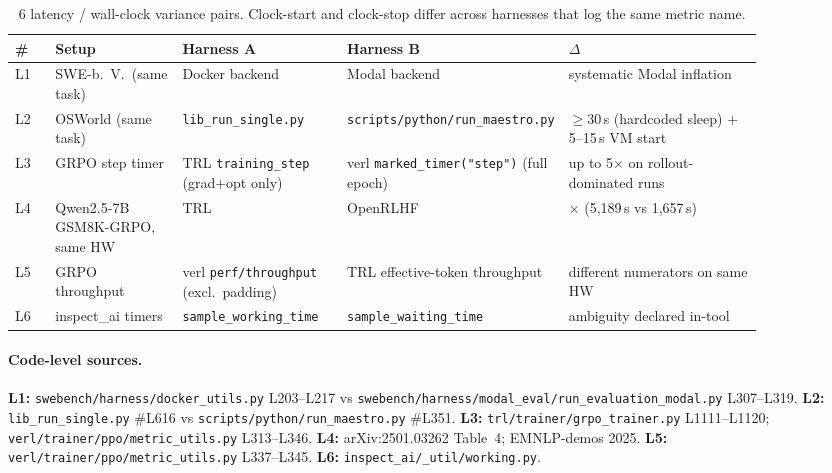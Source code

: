 \documentclass{article}
\begin{document}
\begin{table}[h]
\centering
\footnotesize
\setlength{\tabcolsep}{3pt}
\caption{6 latency / wall-clock variance pairs. Clock-start
and clock-stop differ across harnesses that log the same
metric name.}
\label{tab:vc:latency}
\begin{tabular}{@{}l>{\raggedright\arraybackslash}p{0.17\linewidth}>{\raggedright\arraybackslash}p{0.22\linewidth}>{\raggedright\arraybackslash}p{0.22\linewidth}>{\raggedright\arraybackslash}p{0.26\linewidth}@{}}
\toprule
\textbf{\#} & \textbf{Setup} & \textbf{Harness A} &
\textbf{Harness B} & \textbf{$\Delta$} \\
\midrule
L1 & SWE-b.\ V.\ (same task)       & Docker backend                       & Modal backend                       & systematic Modal inflation            \\
L2 & OSWorld (same task)          & \texttt{lib\_run\_single.py}         & \texttt{scripts/python/}\allowbreak\texttt{run\_maestro.py} & $\ge$30\,s (hardcoded sleep) + 5--15\,s VM start \\
L3 & GRPO step timer              & TRL \texttt{training\_}\allowbreak\texttt{step} (grad+opt only) & verl \texttt{marked\_timer(}\allowbreak\texttt{"step")} (full epoch) & up to 5$\times$ on rollout-dominated runs \\
L4 & Qwen2.5-7B GSM8K-GRPO, same HW & TRL                                & OpenRLHF                            & 3.13$\times$ (5{,}189\,s vs 1{,}657\,s) \\
L5 & GRPO throughput              & verl \texttt{perf/throughput} (excl.\ padding) & TRL effective-token throughput      & different numerators on same HW        \\
L6 & inspect\_ai timers           & \texttt{sample\_working\_time}       & \texttt{sample\_waiting\_time}      & ambiguity declared in-tool            \\
\bottomrule
\end{tabular}
\end{table}

\paragraph{Code-level sources.}
{\footnotesize\raggedright
\textbf{L1:} \texttt{swebench/harness/docker\_utils.py}
L203--L217 vs
\texttt{swebench/harness/modal\_eval/run\_evaluation\_modal.py}
L307--L319.
\textbf{L2:} \texttt{lib\_run\_single.py} \#L616 vs
\texttt{scripts/python/run\_maestro.py} \#L351.
\textbf{L3:} \texttt{trl/trainer/grpo\_trainer.py} L1111--L1120;
\texttt{verl/trainer/ppo/metric\_utils.py} L313--L346.
\textbf{L4:} arXiv:2501.03262 Table~4; EMNLP-demos 2025.
\textbf{L5:} \texttt{verl/trainer/ppo/metric\_utils.py}
L337--L345.
\textbf{L6:} \texttt{inspect\_ai/\_util/working.py}.
\par}
\end{document}
